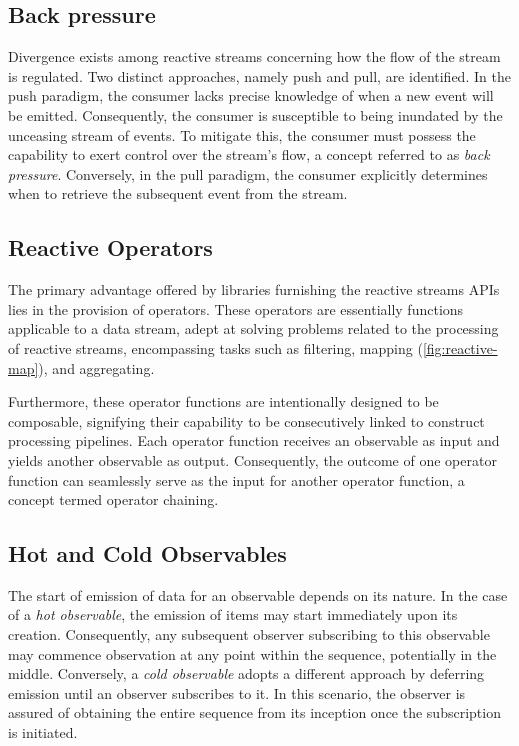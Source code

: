\documentclass[12pt,a4paper,openright,twoside]{book}
\begin{document}
\subsection{Back pressure}

Divergence exists among reactive streams concerning how the flow of the stream is regulated. Two distinct approaches, namely push and pull, are identified. In the push paradigm, the consumer lacks precise knowledge of when a new event will be emitted. Consequently, the consumer is susceptible to being inundated by the unceasing stream of events. To mitigate this, the consumer must possess the capability to exert control over the stream's flow, a concept referred to as \textit{back pressure}. Conversely, in the pull paradigm, the consumer explicitly determines when to retrieve the subsequent event from the stream.

\subsection{Reactive Operators}

The primary advantage offered by libraries furnishing the reactive streams APIs lies in the provision of operators. These operators are essentially functions applicable to a data stream, adept at solving problems related to the processing of reactive streams, encompassing tasks such as filtering, mapping (\cref{fig:reactive-map}), and aggregating.

Furthermore, these operator functions are intentionally designed to be composable, signifying their capability to be consecutively linked to construct processing pipelines. Each operator function receives an observable as input and yields another observable as output. Consequently, the outcome of one operator function can seamlessly serve as the input for another operator function, a concept termed operator chaining.

\subsection{Hot and Cold Observables}

The start of emission of data for an observable depends on its nature. In the case of a \textit{hot observable}, the emission of items may start immediately upon its creation. Consequently, any subsequent observer subscribing to this observable may commence observation at any point within the sequence, potentially in the middle. Conversely, a \textit{cold observable} adopts a different approach by deferring emission until an observer subscribes to it. In this scenario, the observer is assured of obtaining the entire sequence from its inception once the subscription is initiated.
\end{document}
